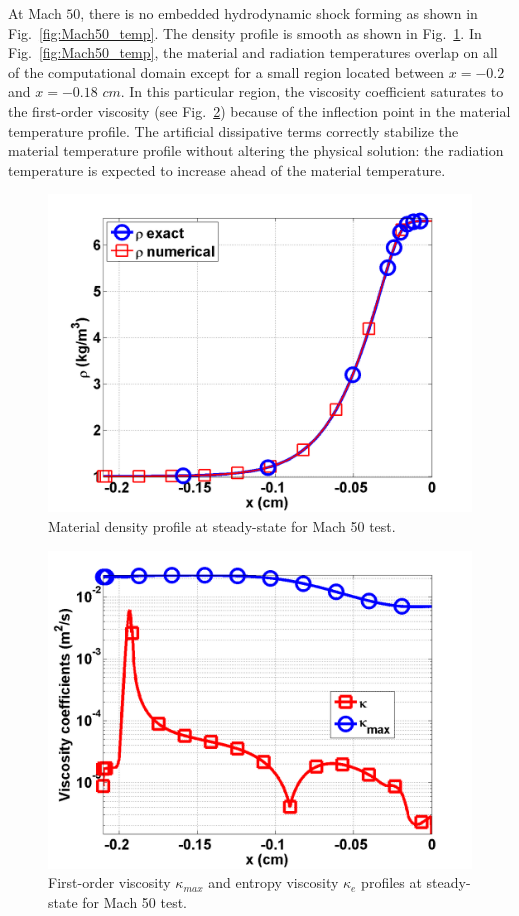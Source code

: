 \documentclass[review]{elsarticle}
\newcommand{\fig}[1]{Fig.~\ref{#1}}                      %
\begin{document}
At Mach $50$, there is no embedded hydrodynamic shock forming as shown in \fig{fig:Mach50_temp}. The density profile is smooth as shown in \fig{fig:Mach50_density}. In \fig{fig:Mach50_temp}, the material and radiation temperatures overlap on all of the computational domain except for a small region located between $x=-0.2$ and $x=-0.18$ $cm$. In this particular region, the viscosity coefficient saturates to the first-order viscosity (see \fig{fig:Mach50_viscosity}) because of the inflection point in the material temperature profile. The artificial dissipative terms correctly stabilize the material temperature profile without altering the physical solution: the radiation temperature is expected to increase ahead of the material temperature.
\begin{figure}[H]
                \centering
                \includegraphics[width=\textwidth]{Mach_50_nel_1000_density.png}
        \caption{Material density profile at steady-state for Mach 50 test.}\label{fig:Mach50_density}
\end{figure}
\begin{figure}[H]
                \centering
                \includegraphics[width=\textwidth]{Mach_50_nel_1000_viscosity.png}
        \caption{First-order viscosity $\kappa_{max}$ and entropy viscosity $\kappa_e$ profiles at steady-state for Mach 50 test.}\label{fig:Mach50_viscosity}
\end{figure}
\end{document}
